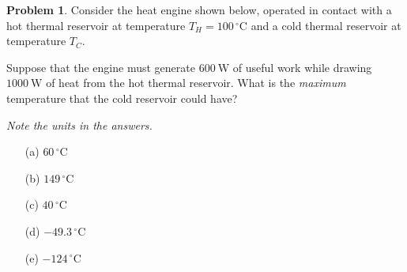 \documentclass[10pt]{article}
\theoremstyle{definition} %
\newtheorem{problem}{Problem}
\theoremstyle{plain} %
\begin{document}
    \begin{problem}
      Consider the heat engine shown below, operated in contact with a hot thermal reservoir at temperature \(T_H = 100\,^{\circ}\text{C}\) and a cold thermal reservoir at temperature \(T_C\).
      
      \medskip
      Suppose that the engine must generate \(600\ \text{W}\) of useful work while drawing \(1000\ \text{W}\) of heat from the hot thermal reservoir.  What is the \emph{maximum} temperature that the cold reservoir could have?
      
      \smallskip
      \textit{Note the units in the answers.}
      
      \begin{enumerate}
        \item[(a)] \(60\,^{\circ}\text{C}\)
        \item[(b)] \(149\,^{\circ}\text{C}\)
        \item[(c)] \(40\,^{\circ}\text{C}\)
        \item[(d)] \(-49.3\,^{\circ}\text{C}\)
        \item[(e)] \(-124\,^{\circ}\text{C}\)
      \end{enumerate}
      \end{problem}
\end{document}
